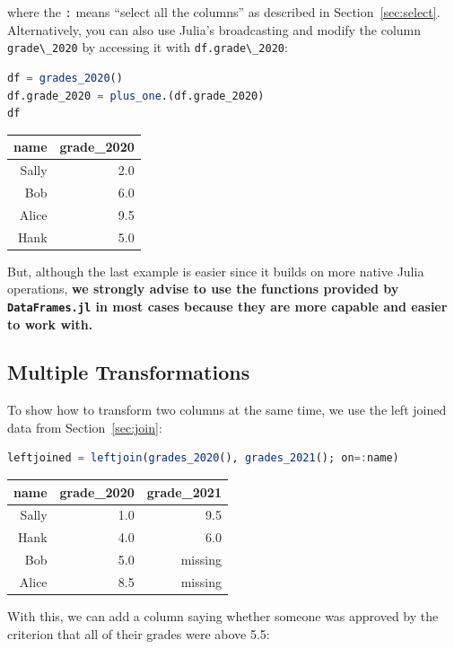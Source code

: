 \documentclass[
  notoc %
]{tufte-book}
\newcommand{\passthrough}[1]{#1}
\begin{document}
where the \passthrough{\lstinline!:!} means ``select all the columns''
as described in Section~\ref{sec:select}. Alternatively, you can also
use Julia's broadcasting and modify the column
\passthrough{\lstinline!grade\_2020!} by accessing it with
\passthrough{\lstinline!df.grade\_2020!}:

\begin{lstlisting}[language=Julia]
df = grades_2020()
df.grade_2020 = plus_one.(df.grade_2020)
df
\end{lstlisting}

\begin{longtable}[]{@{}rr@{}}
\toprule
name & grade\_2020 \\
\midrule
\endhead
Sally & 2.0 \\
Bob & 6.0 \\
Alice & 9.5 \\
Hank & 5.0 \\
\bottomrule
\end{longtable}

But, although the last example is easier since it builds on more native
Julia operations, \textbf{we strongly advise to use the functions
provided by \passthrough{\lstinline!DataFrames.jl!} in most cases
because they are more capable and easier to work with.}

\hypertarget{sec:multiple_transform}{%
\subsection{Multiple Transformations}\label{sec:multiple_transform}}

To show how to transform two columns at the same time, we use the left
joined data from Section~\ref{sec:join}:

\begin{lstlisting}[language=Julia]
leftjoined = leftjoin(grades_2020(), grades_2021(); on=:name)
\end{lstlisting}

\begin{longtable}[]{@{}rrr@{}}
\toprule
name & grade\_2020 & grade\_2021 \\
\midrule
\endhead
Sally & 1.0 & 9.5 \\
Hank & 4.0 & 6.0 \\
Bob & 5.0 & missing \\
Alice & 8.5 & missing \\
\bottomrule
\end{longtable}

With this, we can add a column saying whether someone was approved by
the criterion that all of their grades were above 5.5:
\end{document}
